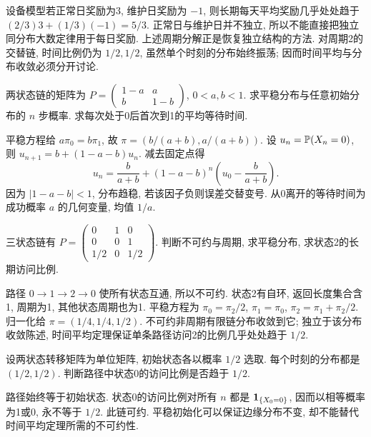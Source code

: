 \begin{example}
设备模型若正常日奖励为3, 维护日奖励为 $-1$, 则长期每天平均奖励几乎处处趋于
$(2/3)3+(1/3)(-1)=5/3$. 正常日与维护日并不独立, 所以不能直接把独立同分布大数定律用于每日奖励. 上述周期分解正是恢复独立结构的方法. 对周期2的交替链, 时间比例仍为 $1/2,1/2$, 虽然单个时刻的分布始终振荡; 因而时间平均与分布收敛必须分开讨论.
\end{example}

\begin{exercise}
两状态链的矩阵为 $P=\begin{pmatrix}1-a&a\\b&1-b\end{pmatrix}$, $0<a,b<1$. 求平稳分布与任意初始分布的 $n$ 步概率. 求每次处于0后首次到1的平均等待时间.
\end{exercise}
\begin{solution}
平稳方程给 $a\pi_0=b\pi_1$, 故 $\pi=(b/(a+b),a/(a+b))$. 设 $u_n=\mathbb P(X_n=0)$, 则 $u_{n+1}=b+(1-a-b)u_n$. 减去固定点得
\[u_n=\frac b{a+b}+(1-a-b)^n\left(u_0-\frac b{a+b}\right).\]
因为 $|1-a-b|<1$, 分布趋稳, 若该因子负则误差交替变号. 从0离开的等待时间为成功概率 $a$ 的几何变量, 均值 $1/a$.
\end{solution}
\begin{exercise}
三状态链有 $P=\begin{pmatrix}0&1&0\\0&0&1\\1/2&0&1/2\end{pmatrix}$. 判断不可约与周期, 求平稳分布, 求状态2的长期访问比例.
\end{exercise}
\begin{solution}
路径 $0\to1\to2\to0$ 使所有状态互通, 所以不可约. 状态2有自环, 返回长度集合含1, 周期为1, 其他状态周期也为1. 平稳方程为 $\pi_0=\pi_2/2$, $\pi_1=\pi_0$, $\pi_2=\pi_1+\pi_2/2$. 归一化给 $\pi=(1/4,1/4,1/2)$. 不可约非周期有限链分布收敛到它; 独立于该分布收敛陈述, 时间平均定理保证单条路径访问2的比例几乎处处趋于 $1/2$.
\end{solution}
\begin{exercise}
设两状态转移矩阵为单位矩阵, 初始状态各以概率 $1/2$ 选取. 每个时刻的分布都是 $(1/2,1/2)$. 判断路径中状态0的访问比例是否趋于 $1/2$.
\end{exercise}
\begin{solution}
路径始终等于初始状态. 状态0的访问比例对所有 $n$ 都是 $\mathbf 1_{\{X_0=0\}}$, 因而以相等概率为1或0, 永不等于 $1/2$. 此链可约. 平稳初始化可以保证边缘分布不变, 却不能替代时间平均定理所需的不可约性.
\end{solution}
